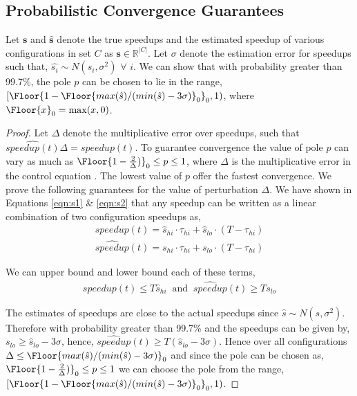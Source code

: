 \subsection*{Probabilistic Convergence Guarantees}


\begin{theorem}
  Let $\mathbf{s}$ and $\hat{\mathbf{s}}$ denote the true speedups and the estimated speedup of various configurations in set $C$ as $\mathbf{s} \in \mathbb{R}^{|C|}$. Let $\sigma$ denote the
  estimation error for speedups such that, $\hat{s_i} \sim
  N(s_i, \sigma^2)$ $\forall$ $i$. We can show that with probability
  greater than 99.7\%, the pole $p$ can be chosen to lie in the range, $[\Floor{1- \Floor{max(\hat{s})/(min(\hat{s}) -  3\sigma)}_0}_0, 1)$, where $\Floor{x}_0 = \max(x,0)$.
\end{theorem}

\begin{proof}
Let $\Delta$ denote the multiplicative error over speedups, such that $ \widehat{speedup(t)}\Delta = speedup(t) $. To
guarantee convergence the value of pole $p$ can vary as much as
$\Floor{1-\frac{2}{\Delta})}_0\leq p \leq 1$, where $\Delta$ is the
multiplicative error in the control equation \cite{ICSE2014}. The lowest value of $p$ offer the fastest convergence. We prove the
following guarantees for the value of perturbation $\Delta$.
  We have shown in Equations \ref{eqn:s1} \& \ref{eqn:s2} that any
  speedup can be written as a linear combination of two configuration
  speedups as,
\begin{align}
speedup(t) = \hat{s}_{hi} \cdot \tau_{hi} + \hat{s}_{lo} \cdot (T - \tau_{hi})
\end{align}
\begin{align}
\widehat{speedup}(t) = s_{hi} \cdot \tau_{hi} + s_{lo} \cdot (T - \tau_{hi})
\end{align}

We can upper bound and lower bound each of these terms,
\begin{align}
speedup(t) \leq T \hat{s}_{hi} \;\; \text{and} \;\; \widehat{speedup}(t) \geq T s_{lo}
\end{align}

The estimates of speedups are close to the actual speedups since
$\hat{s} \sim N(s, \sigma^2)$. Therefore with probability greater
than 99.7\% and the speedups can be given by, $s_{lo} \geq
\hat{s}_{lo} - 3 \sigma$, hence, $\widehat{speedup}(t) \geq T
(\hat{s}_{lo} -3 \sigma)$. Hence over all configurations $\Delta \leq
\Floor{max(\hat{s})/(min(\hat{s}) - 3\sigma)}_0$ and since the pole
can be chosen as, $\Floor{1-\frac{2}{\Delta})}_0\leq p \leq 1$ we can choose the pole from the range,  $[\Floor{1-
  \Floor{max(\hat{s})/(min(\hat{s}) - 3\sigma)}_0}_0, 1)$.

\end{proof}
